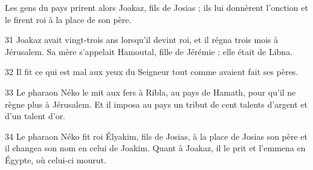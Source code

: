 Les gens du pays prirent alors Joakaz, fils de Josias ; ils lui donnèrent l’onction et le firent roi à la place de son père.

31 Joakaz avait vingt-trois ans lorsqu’il devint roi, et il régna trois mois à Jérusalem. Sa mère s’appelait Hamoutal, fille de Jérémie ; elle était de Libna.

32 Il fit ce qui est mal aux yeux du Seigneur tout comme avaient fait ses pères.

33 Le pharaon Néko le mit aux fers à Ribla, au pays de Hamath, pour qu’il ne règne plus à Jérusalem. Et il imposa au pays un tribut de cent talents d’argent et d’un talent d’or.

34 Le pharaon Néko fit roi Élyakim, fils de Josias, à la place de Josias son père et il changea son nom en celui de Joakim. Quant à Joakaz, il le prit et l’emmena en Égypte, où celui-ci mourut.
